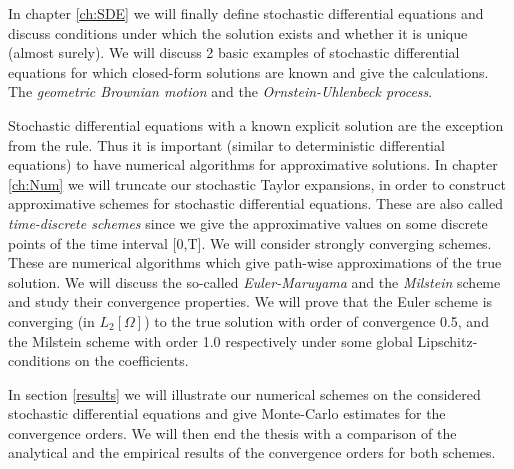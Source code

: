 In chapter \ref{ch:SDE} we will finally define stochastic differential equations and discuss conditions under which the solution exists and whether it is unique (almost surely).
We will discuss 2 basic examples of stochastic differential equations for which closed-form solutions are known and give the calculations. The \emph{geometric Brownian motion} and the \emph{Ornstein-Uhlenbeck process}.
\linebreak

Stochastic differential equations with a known explicit solution are the exception from the rule. Thus it is important (similar to deterministic differential equations) to have numerical algorithms for approximative solutions.
In chapter \ref{ch:Num} we will truncate our stochastic Taylor expansions, in order to construct approximative schemes for stochastic differential equations. These are also called \emph{time-discrete schemes} since we give the approximative values on some discrete points of the time interval [0,T].
We will consider strongly converging schemes. These are numerical algorithms which give path-wise approximations of the true solution.
We will discuss the so-called \emph{Euler-Maruyama} and the \emph{Milstein} scheme and study their convergence properties. We will prove that the Euler scheme is converging (in \(L_2[\Omega]\)) to the true solution with order of convergence 0.5, and the Milstein scheme with order 1.0 respectively under some global Lipschitz-conditions on the coefficients.
\linebreak

In section \ref{results} we will illustrate our numerical schemes on the considered stochastic differential equations and give Monte-Carlo estimates for the convergence orders. We will then end the thesis with a comparison of the analytical and the empirical results of the convergence orders for both schemes.
